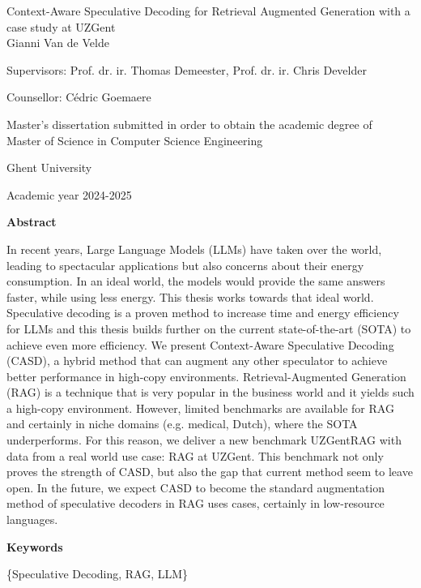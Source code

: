 \newpage
\begin{center}
    \LARGE
    Context-Aware Speculative Decoding for Retrieval Augmented
Generation with a case study at UZGent \\
    
    \vspace{1cm}
    \large
    Gianni Van de Velde
    
    Supervisors: Prof. dr. ir. Thomas Demeester, Prof. dr. ir. Chris Develder
    
    Counsellor: Cédric Goemaere
    
    Master's dissertation submitted in order to obtain the academic degree of\\
    Master of Science in Computer Science Engineering
    
    Ghent University
    
    Academic year 2024-2025
\end{center}

\vspace{0.5cm}
\begin{center}
    \textbf{\Large Abstract}
\end{center}

In recent years, Large Language Models (LLMs) have taken over the world, leading to spectacular applications but also concerns about their energy consumption. In an ideal world, the models would provide the same answers faster, while using less energy. This thesis works towards that ideal world. Speculative decoding is a proven method to increase time and energy efficiency for LLMs and this thesis builds further on the current state-of-the-art (SOTA) to achieve even more efficiency. We present Context-Aware Speculative Decoding (CASD), a hybrid method that can augment any other speculator to achieve better performance in high-copy environments. Retrieval-Augmented Generation (RAG) is a technique that is very popular in the business world and it yields such a high-copy environment. However, limited benchmarks are available for RAG and certainly in niche domains (e.g. medical, Dutch), where the SOTA underperforms. For this reason, we deliver a new benchmark UZGentRAG with data from a real world use case: RAG at UZGent. This benchmark not only proves the strength of CASD, but also the gap that current method seem to leave open. In the future, we expect CASD to become the standard augmentation method of speculative decoders in RAG uses cases, certainly in low-resource languages.

\begin{center}
    \textbf{\Large Keywords}
\end{center}
\begin{center}
    \{Speculative Decoding, RAG, LLM\}
\end{center}
